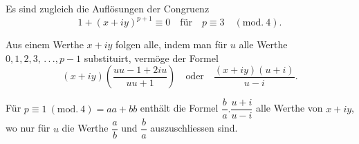 Es sind zugleich die Auflösungen der Congruenz
\[
1+(x+iy)^{p+1}\equiv0\quad\text{für}\quad p\equiv3\quad(\mathrm{mod.}\ 4).
\]
\par\indent Aus einem Werthe $x+iy$ folgen alle, indem man für $u$ alle Werthe\\
$0,1,2,3,\, .\, .\, .,p-1$ substituirt, vermöge der Formel
\[
(x+iy)\left(\frac{uu-1+2iu}{uu+1}\right)\quad\text{oder}\quad\frac{(x+iy)(u+i)}{u-i}.
\]
\par\indent Für $p\equiv1\ (\mathrm{mod.}\ 4)=aa+bb$ enthält die Formel $\dfrac{b}{a}.\dfrac{u+i}{u-i}$ alle Werthe von $x+iy$, wo nur für $u$ die Werthe $\dfrac{a}{b}$ und $\dfrac{b}{a}$ auszuschliessen sind.

